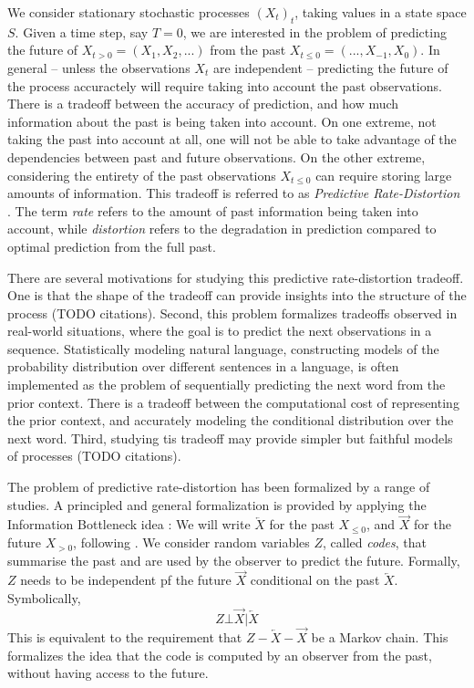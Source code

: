 \documentclass[11pt,letterpaper]{article}
\begin{document}
We consider stationary stochastic processes $(X_t)_t$, taking values in a state space $S$.
Given a time step, say $T=0$, we are interested in the problem of predicting the future of $X_{t>0} = (X_1, X_2, ...)$ from the past $X_{t\leq 0} = (..., X_{-1}, X_0)$.
In general -- unless the observations $X_t$ are independent -- predicting the future of the process accuractely will require taking into account the past observations.
There is a tradeoff between the accuracy of prediction, and how much information about the past is being taken into account.
On one extreme, not taking the past into account at all, one will not be able to take advantage of the dependencies between past and future observations.
On the other extreme, considering the entirety of the past observations $X_{t \leq 0}$ can require storing large amounts of information.
This tradeoff is referred to as \emph{Predictive Rate-Distortion} \citep{marzen-predictive-2016}.
The term \emph{rate} refers to the amount of past information being taken into account, while \emph{distortion} refers to the degradation in prediction compared to optimal prediction from the full past.


There are several motivations for studying this predictive rate-distortion tradeoff.
One is that the shape of the tradeoff can provide insights into the structure of the process (TODO citations).
Second, this problem formalizes tradeoffs observed in real-world situations, where the goal is to predict the next observations in a sequence.
Statistically modeling natural language, constructing models of the probability distribution over different sentences in a language, is often implemented as the problem of sequentially predicting the next word from the prior context.
There is a tradeoff between the computational cost of representing the prior context, and accurately modeling the conditional distribution over the next word.
Third, studying tis tradeoff may provide simpler but faithful models of processes (TODO citations).


The problem of predictive rate-distortion has been formalized by a range of studies.
A principled and general formalization is provided by applying the Information Bottleneck idea \citep{still-optimal-2010, marzen-predictive-2016}:
We will write $\overleftarrow{X}$ for the past $X_{\leq 0}$, and $\overrightarrow{X}$ for the future $X_{> 0}$, following \cite{marzen-predictive-2016}.
We consider random variables $Z$, called \emph{codes}, that summarise the past and are used by the observer to predict the future.
Formally, $Z$ needs to be independent pf the future $\overrightarrow{X}$ conditional on the past $\overleftarrow{X}$. Symbolically, 
\begin{equation}
	Z \bot \overrightarrow{X} | \overleftarrow{X}
\end{equation}
This is equivalent to the requirement that $Z - \overleftarrow{X} - \overrightarrow{X}$ be a Markov chain.
This formalizes the idea that the code is computed by an observer from the past, without having access to the future.
\end{document}
